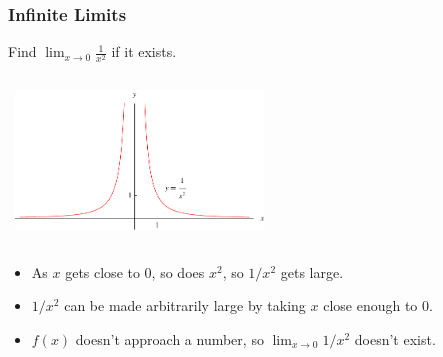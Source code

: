 \begin{frame}
\frametitle{Infinite Limits}
\begin{example}[Example 8, p. 101]
Find $\lim_{x\rightarrow 0} \frac{1}{x^2}$ if it exists.
\begin{columns}[c]
\ \includegraphics[height=3.7cm]{limits/pictures/02-02-xminustwo.pdf}%
\end{columns}
\begin{itemize}
\item<2->  As $x$ gets close to 0, so does $x^2$,  so $1/x^2$ gets large. 
\item<3->  $1/x^2$ can be made arbitrarily large by taking $x$ close enough to 0.
\item<4->  $f(x)$ doesn't approach a number, so $\lim_{x\rightarrow 0} 1/x^2$ doesn't exist.
\end{itemize}
\end{example}
\end{frame}
